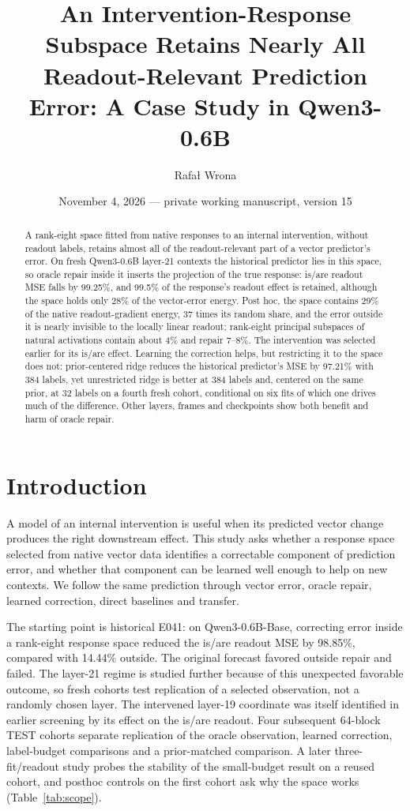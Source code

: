 \documentclass[11pt]{article}
\title{An Intervention-Response Subspace Retains Nearly All\\Readout-Relevant Prediction Error: A Case Study in Qwen3-0.6B}
\author{Rafa\l{} Wrona}
\date{November 4, 2026 --- private working manuscript, version 15}
\begin{document}
\maketitle
\begin{abstract}
A rank-eight space fitted from native responses to an internal intervention, without readout labels, retains almost all of the readout-relevant part of a vector predictor's error. On fresh Qwen3-0.6B layer-21 contexts the historical predictor lies in this space, so oracle repair inside it inserts the projection of the true response: is/are readout MSE falls by 99.25\%, and 99.5\% of the response's readout effect is retained, although the space holds only 28\% of the vector-error energy. Post hoc, the space contains 29\% of the native readout-gradient energy, 37 times its random share, and the error outside it is nearly invisible to the locally linear readout; rank-eight principal subspaces of natural activations contain about 4\% and repair 7--8\%. The intervention was selected earlier for its is/are effect. Learning the correction helps, but restricting it to the space does not: prior-centered ridge reduces the historical predictor's MSE by 97.21\% with 384 labels, yet unrestricted ridge is better at 384 labels and, centered on the same prior, at 32 labels on a fourth fresh cohort, conditional on six fits of which one drives much of the difference. Other layers, frames and checkpoints show both benefit and harm of oracle repair.
\end{abstract}

\section{Introduction}
A model of an internal intervention is useful when its predicted vector change produces the right downstream effect. This study asks whether a response space selected from native vector data identifies a correctable component of prediction error, and whether that component can be learned well enough to help on new contexts. We follow the same prediction through vector error, oracle repair, learned correction, direct baselines and transfer.

The starting point is historical E041: on Qwen3-0.6B-Base, correcting error inside a rank-eight response space reduced the is/are readout MSE by 98.85\%, compared with 14.44\% outside. The original forecast favored outside repair and failed. The layer-21 regime is studied further because of this unexpected favorable outcome, so fresh cohorts test replication of a selected observation, not a randomly chosen layer. The intervened layer-19 coordinate was itself identified in earlier screening by its effect on the is/are readout. Four subsequent 64-block TEST cohorts separate replication of the oracle observation, learned correction, label-budget comparisons and a prior-matched comparison. A later three-fit/readout study probes the stability of the small-budget result on a reused cohort, and posthoc controls on the first cohort ask why the space works (Table~\ref{tab:scope}).
\end{document}
